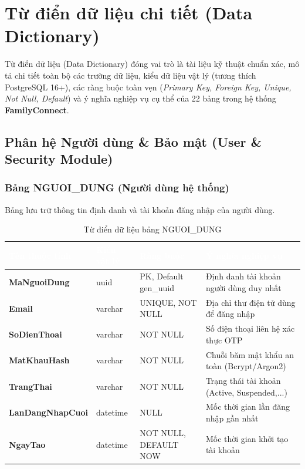 \section{Từ điển dữ liệu chi tiết (Data Dictionary)}
\label{sec:3_2_tu_dien_du_lieu}

Từ điển dữ liệu (Data Dictionary) đóng vai trò là tài liệu kỹ thuật chuẩn xác, mô tả chi tiết toàn bộ các trường dữ liệu, kiểu dữ liệu vật lý (tương thích PostgreSQL 16+), các ràng buộc toàn vẹn (\textit{Primary Key, Foreign Key, Unique, Not Null, Default}) và ý nghĩa nghiệp vụ cụ thể của 22 bảng trong hệ thống \textbf{FamilyConnect}.

\subsection{Phân hệ Người dùng \& Bảo mật (User \& Security Module)}

\subsubsection{Bảng NGUOI\_DUNG (Người dùng hệ thống)}
Bảng lưu trữ thông tin định danh và tài khoản đăng nhập của người dùng.
\begin{table}[H]
\centering\small
\renewcommand{\arraystretch}{1.3}
\begin{tabularx}{\textwidth}{|>{\raggedright\arraybackslash\bfseries}p{3.2cm}|>{\raggedright\arraybackslash}p{2.3cm}|>{\raggedright\arraybackslash}p{3.2cm}|>{\raggedright\arraybackslash}X|}
\hline
\rowcolor{tableheader}
\textcolor{white}{\textbf{Tên thuộc tính}} & \textcolor{white}{\textbf{Kiểu vật lý}} & \textcolor{white}{\textbf{Ràng buộc}} & \textcolor{white}{\textbf{Ý nghĩa nghiệp vụ}} \\
\hline
MaNguoiDung & uuid & PK, Default gen\_uuid & Định danh tài khoản người dùng duy nhất \\
\hline
Email & varchar & UNIQUE, NOT NULL & Địa chỉ thư điện tử dùng để đăng nhập \\
\hline
SoDienThoai & varchar & NOT NULL & Số điện thoại liên hệ xác thực OTP \\
\hline
MatKhauHash & varchar & NOT NULL & Chuỗi băm mật khẩu an toàn (Bcrypt/Argon2) \\
\hline
TrangThai & varchar & NOT NULL & Trạng thái tài khoản (Active, Suspended,...) \\
\hline
LanDangNhapCuoi & datetime & NULL & Mốc thời gian lần đăng nhập gần nhất \\
\hline
NgayTao & datetime & NOT NULL, DEFAULT NOW & Mốc thời gian khởi tạo tài khoản \\
\hline
\end{tabularx}
\caption{Từ điển dữ liệu bảng NGUOI\_DUNG}
\label{tab:dict_nguoi_dung}
\end{table}

